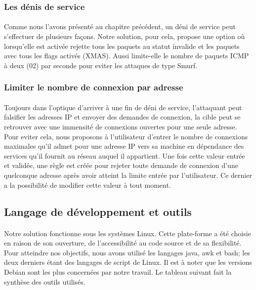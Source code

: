  		\subsubsection{Les dénis de service}
      \paragraph{}
		Comme nous l'avons présenté au chapitre précédent, un déni de service peut s'effectuer de plusieurs façons. Notre solution, pour cela, propose une option où lorsqu'elle est activée rejette tous les paquets au statut invalide et les paquets avec tous les flags activés (XMAS). Aussi limite-elle le nombre de paquets ICMP à deux (02) par seconde pour eviter les attaques de type Smurf.   
     
	\subsubsection{Limiter le nombre de connexion par adresse}
      \paragraph{}
     Toujours dans l'optique d'arriver à une fin de déni de service, l'attaquant peut falsifier les adresses IP et envoyer des demandes de connexion, la cible peut se retrouver avec une immensité de connexions ouvertes pour une seule adresse. Pour eviter cela, nous proposons à l'utilisateur d'entrer le nombre de connexions maximales qu'il admet pour une adresse IP vers sa machine en dépendance des services qu'il fournit au réseau auquel il appartient. Une fois cette valeur entrée et validée, une règle est créée pour rejeter toute demande de connexion d'une quelconque adresse après avoir atteint la limite entrée par l'utilisateur. Ce dernier a la possibilité de modifier cette valeur à tout moment.    
  \subsection{Langage de développement et outils}
  
      \paragraph{}
	  Notre solution fonctionne sous les systèmes Linux. Cette plate-forme a été choisie en raison de son ouverture, de l'accessibilité au code source et de sa flexibilité. Pour atteindre nos objectifs, nous avons utilisé les langages java, awk et bash; les deux derniers étant des langages de script de Linux. Il est à noter que les versions Debian sont les plus concernées par notre travail. Le tableau suivant fait la synthèse des outils utilisés.
	  
